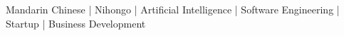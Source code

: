 
\begin{cvinterests}
    {Mandarin Chinese | Nihongo | Artificial Intelligence | Software Engineering | Startup | Business Development}
\end{cvinterests}
